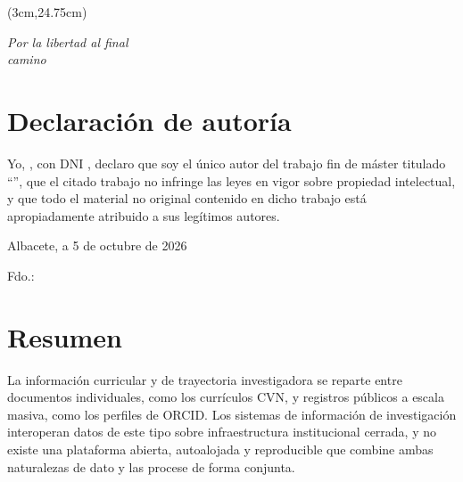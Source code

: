 \begin{textblock*}{\textwidth}(3cm,24.75cm) 
\begin{flushright}
{\fontsize{14pt}{4pt}\selectfont \fecha}
\end{flushright}
\end{textblock*}


\cleardoublepage
\thispagestyle{empty}

\vspace*{9cm}  
\begin{flushright} \em 
Por la libertad al final \\
camino 
\end{flushright}


\cleardoublepage
\thispagestyle{plain}
\chapter*{Declaración de autoría}


Yo, \autor, con DNI \quad \dniautor \quad, declaro que soy el único autor del trabajo fin de máster titulado ``\titulo'', que el citado trabajo no infringe las leyes en vigor sobre propiedad intelectual, y que todo el material no original contenido en dicho trabajo está apropiadamente atribuido a sus legítimos autores.

\vspace*{2cm}
\begin{center}
Albacete, a 5 de octubre de 2026

\vskip3cm

Fdo.: \autor
\end{center}


\cleardoublepage
\thispagestyle{plain}
\chapter*{Resumen}

La información curricular y de trayectoria investigadora se reparte entre
documentos individuales, como los currículos CVN, y registros públicos a
escala masiva, como los perfiles de ORCID. Los sistemas de información de
investigación interoperan datos de este tipo sobre infraestructura
institucional cerrada, y no existe una plataforma abierta, autoalojada y
reproducible que combine ambas naturalezas de dato y las procese de forma
conjunta.

